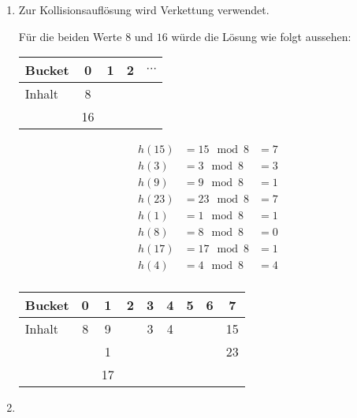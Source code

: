 \documentclass{lehramt-informatik}
\begin{document}
\begin{enumerate}


\item {}

Zur Kollisionsauflösung wird Verkettung
verwendet.


Für die beiden Werte $8$ und $16$ würde die Lösung wie folgt aussehen:

\begin{center}
\begin{tabular}{l|cccc}
Bucket    & 0  & 1      & 2 & $\cdots$ \\\hline
Inhalt    & 8 \\
          & 16 \\
\end{tabular}
\end{center}

\begin{antwort}
{\footnotesize
\begin{equation*}
\begin{aligned}
h(15) &= 15 \mod 8 &= 7\\
h(3)  &= 3 \mod 8  &= 3\\
h(9)  &= 9 \mod 8  &= 1\\
h(23) &= 23 \mod 8 &= 7\\
h(1)  &= 1 \mod 8  &= 1\\
h(8)  &= 8 \mod 8  &= 0\\
h(17) &= 17 \mod 8 &= 1\\
h(4)  &= 4 \mod 8  &= 4\\
\end{aligned}
\end{equation*}}

\begin{center}
\begin{tabular}{l|cccccccc}
Bucket & 0 & 1 & 2 & 3 & 4 & 5 & 6 & 7  \\\hline
Inhalt & 8 & 9 &   & 3 & 4 &   &   & 15 \\
       &   & 1 &   &   &   &   &   & 23 \\
       &   & 17 &  &   &   &   &   &    \\
\end{tabular}
\end{center}
\end{antwort}


\item {}


\end{enumerate}
\end{document}
